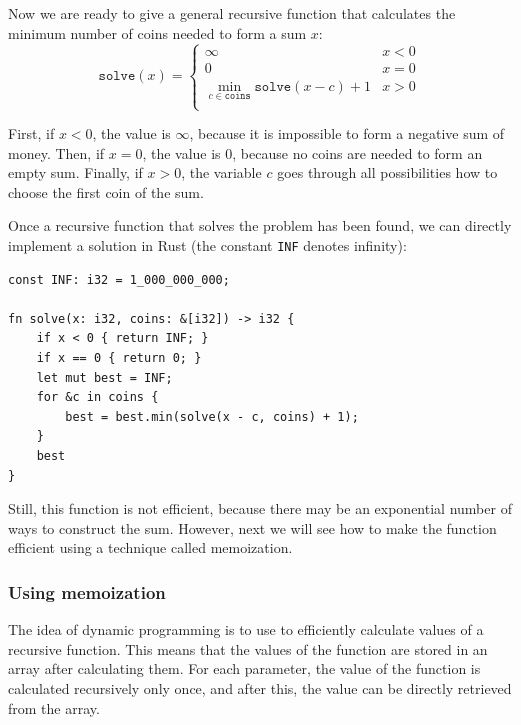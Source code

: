 Now we are ready to give a general recursive function
that calculates the minimum number of
coins needed to form a sum $x$:
\begin{equation*}
    \texttt{solve}(x) = \begin{cases}
               \infty               & x < 0\\
               0               & x = 0\\
               \min_{c \in \texttt{coins}} \texttt{solve}(x-c)+1 & x > 0 \\
           \end{cases}
\end{equation*}

First, if $x<0$, the value is $\infty$,
because it is impossible to form a negative
sum of money.
Then, if $x=0$, the value is $0$,
because no coins are needed to form an empty sum.
Finally, if $x>0$, the variable $c$ goes through
all possibilities how to choose the first coin
of the sum.

Once a recursive function that solves the problem
has been found,
we can directly implement a solution in Rust
(the constant \texttt{INF} denotes infinity):

\begin{lstlisting}
const INF: i32 = 1_000_000_000;

fn solve(x: i32, coins: &[i32]) -> i32 {
    if x < 0 { return INF; }
    if x == 0 { return 0; }
    let mut best = INF;
    for &c in coins {
        best = best.min(solve(x - c, coins) + 1);
    }
    best
}
\end{lstlisting}

Still, this function is not efficient,
because there may be an exponential number of ways
to construct the sum.
However, next we will see how to make the
function efficient using a technique called memoization.

\subsubsection{Using memoization}


The idea of dynamic programming is to use
 to efficiently calculate
values of a recursive function.
This means that the values of the function
are stored in an array after calculating them.
For each parameter, the value of the function
is calculated recursively only once, and after this,
the value can be directly retrieved from the array.

